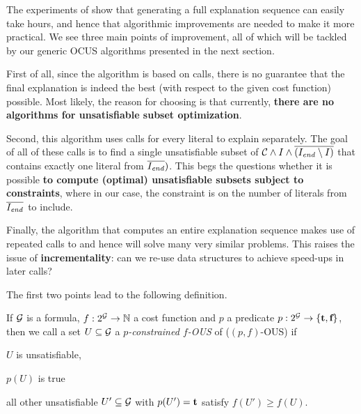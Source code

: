 The experiments of \citet{ecai/BogaertsGCG20} show that generating a full explanation sequence can easily take hours, and hence that algorithmic improvements are needed to make it more practical. 
We see three main points of improvement, all of which will be tackled by our generic OCUS algorithms presented in the next section. 
\begin{inparaenum}
 \item First of all, since the algorithm is based on  calls, there is no guarantee that the final explanation is indeed the best (with respect to the given cost function) possible. 
 Most likely, the reason for choosing  is that currently, \textbf{there are no algorithms for unsatisfiable subset optimization}. 
 \item Second, this algorithm uses  calls for every literal to explain separately. The goal of all of these calls is to find a single unsatisfiable subset of $\mathcal{C}  \land I \land \overline{(I_\mathit{end} \setminus I)}$ that contains exactly one literal from $\overline{I_\mathit{end} })$. This begs the questions whether it is possible \textbf{to compute (optimal) unsatisfiable subsets subject to constraints}, where in our case, the constraint is on the number of literals from $\overline{I_\mathit{end} }$ to include. 
 \item Finally, the algorithm that computes an entire explanation sequence makes use of repeated calls to \onestep and hence will solve many very similar problems. This raises the issue of \textbf{incrementality}: can we re-use data structures to achieve speed-ups in later calls? 
\end{inparaenum}

The first two points lead to the following definition. 


\begin{definition}
    If $\mathcal{G} $ is a formula, $f:2^{\mathcal{G} } \to \mathbb{N}$ a cost function and  $p$ a predicate $p: 2^{\mathcal{G} }\to \{\textbf{t},\textbf{f}\}$, then we call a set $U\subseteq \mathcal{G} $ a \emph{$p$-constrained $f$-OUS} of \formulag ($(p,f)$-OUS)   if \begin{compactitem}                                                                                                                                                                                                                         
    \item $U$ is unsatisfiable,
    \item $p(U)$ is true
    \item all other unsatisfiable $U'\subseteq \mathcal{G} $ with $p(U')=\textbf{t}$ satisfy $f(U')\geq f(U)$.                                                                                                                                                                                                                         \end{compactitem}
\end{definition}

